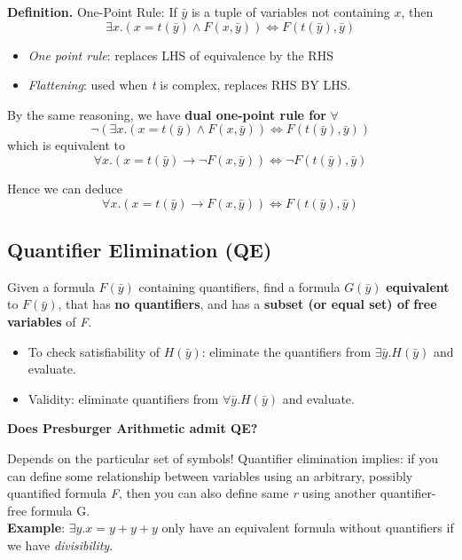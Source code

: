 \documentclass[11pt]{article}
\begin{document}
\begin{tcolorbox}[
    enhanced,
    frame hidden,
    borderline west={2pt}{0pt}{black},
    boxsep=5pt,
    left=8pt
]
\textbf{Definition.} One-Point Rule: If $\bar{y}$ is a tuple of variables not containing $x$, then $$\exists x. (x = t(\bar{y}) \land F(x, \bar{y})) \Leftrightarrow F(t(\bar{y}), \bar{y})$$
\begin{itemize}
	\item \textit{One point rule}: replaces LHS of equivalence by the RHS
	\item \textit{Flattening}: used when \textit{t} is complex, replaces RHS BY LHS.  \\

\end{itemize}
By the same reasoning, we have \textbf{dual one-point rule for} $\forall$ $$\neg (\exists x. (x = t(\bar{y}) \land F(x, \bar{y})) \Leftrightarrow F(t(\bar{y}), \bar{y}))$$ which is equivalent to $$\forall x. (x = t(\bar{y}) \to \neg F(x, \bar{y})) \Leftrightarrow \neg F(t(\bar{y}), \bar{y})$$ 

Hence we can deduce $$\forall x. (x = t(\bar{y}) \to F(x, \bar{y})) \Leftrightarrow F(t(\bar{y}), \bar{y})$$
\end{tcolorbox}

\subsection*{Quantifier Elimination (QE)}
Given a formula $F(\bar{y})$ containing quantifiers, find a formula $G(\bar{y})$ \textbf{equivalent} to $F(\bar{y})$, that has \textbf{no quantifiers}, and has a \textbf{subset (or equal set) of free variables} of \textit{F}.


\begin{itemize}
	\item To check satisfiability of $H(\bar{y})$: eliminate the quantifiers from $\exists \bar{y}. H(\bar{y})$ and evaluate. 
	\item Validity: eliminate quantifiers from $\forall \bar{y}. H(\bar{y})$ and evaluate. 
\end{itemize}

\begin{tcolorbox}[
  colback=gray!15,     %
  colframe=black!50,    %
  boxrule=1pt,       %
  arc=3mm,             %
  left=4mm, right=4mm, top=2mm, bottom=2mm %
]
\textbf{Does Presburger Arithmetic admit QE?}
\vspace{0.3cm}

Depends on the particular set of symbols! Quantifier elimination implies: if you can define some relationship between variables using an arbitrary, possibly quantified formula \textit{F}, then you can also define same \textit{r} using another quantifier-free formula G. \\ 

\textbf{Example}: $\exists y. x = y + y + y$ only have an equivalent formula without quantifiers if we have \textit{divisibility}. 
\end{tcolorbox}
\end{document}

